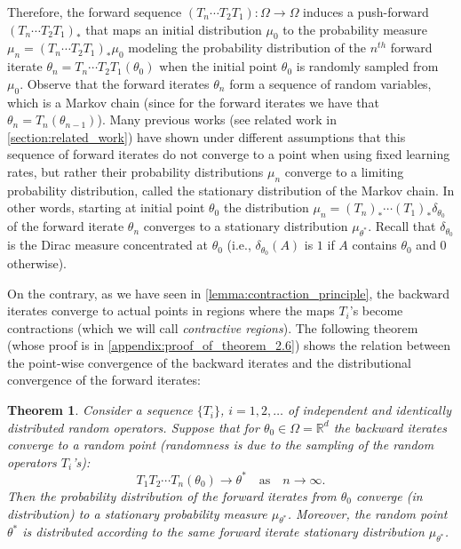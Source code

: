 \documentclass[10pt]{article} %
\theoremstyle{plain}
\newtheorem{theorem}{Theorem}[section]
\theoremstyle{definition}
\theoremstyle{remark}
\begin{document}
Therefore, the forward sequence $(T_n \cdots T_2T_1):\Omega\rightarrow \Omega$ induces a push-forward $(T_n \cdots T_2T_1)_*$ that maps an initial distribution $\mu_0$ to the probability measure $\mu_n = (T_n \cdots T_2T_1)_* \mu_0$ modeling the probability distribution of the $n^{th}$ forward iterate $\theta_n = T_n \cdots T_2T_1(\theta_0)$ when the initial point $\theta_0$ is randomly sampled from $\mu_0$. Observe that the forward iterates $\theta_n$ form a sequence of random variables, which is a Markov chain (since for the forward iterates we have that $\theta_n = T_n(\theta_{n-1})$). Many previous works (see related work in \cref{section:related_work}) have shown under different assumptions that this sequence of forward iterates do not converge to a point when using fixed learning rates, but rather their probability distributions $\mu_n$ converge to a limiting probability distribution, called the stationary distribution of the Markov chain.
In other words, starting at initial point $\theta_0$ the distribution $\mu_n = (T_n)_*\cdots (T_1)_* \delta_{\theta_0}$ of the forward iterate $\theta_n$ converges to a stationary distribution $\mu_{\theta^*}$. Recall that $\delta_{\theta_0}$ is the Dirac measure concentrated at $\theta_0$ (i.e., $\delta_{\theta_0}(A)$ is $1$ if $A$ contains $\theta_0$ and 0 otherwise).

On the contrary, as we have seen in \cref{lemma:contraction_principle}, the backward iterates converge to actual points in regions where the maps $T_i$'s become contractions (which we will call \emph{contractive regions}). The following theorem (whose proof is in \cref{appendix:proof_of_theorem_2.6}) shows the relation between the point-wise convergence of the backward iterates and the distributional convergence of the forward iterates:

\begin{theorem} \label{thm:backward_forward}
Consider a sequence $\{T_i\}$, $i=1,2, \dots$ of independent and identically distributed random operators. Suppose that for $\theta_0 \in \Omega = \mathbb{R}^d$ the backward iterates converge to a random point (randomness is due to the sampling of the random operators $T_i$'s):
\[
 T_1T_2\cdots T_n(\theta_0) \longrightarrow \theta^* \quad\textrm{as}\quad n\rightarrow \infty.
\]
Then the probability distribution of the forward iterates from $\theta_0$ converge (in distribution) to a stationary probability measure $\mu_{\theta^*}$. Moreover, the random point $\theta^*$ is distributed according to the same forward iterate stationary distribution $\mu_{\theta^*}$. 
\end{theorem}
\end{document}
